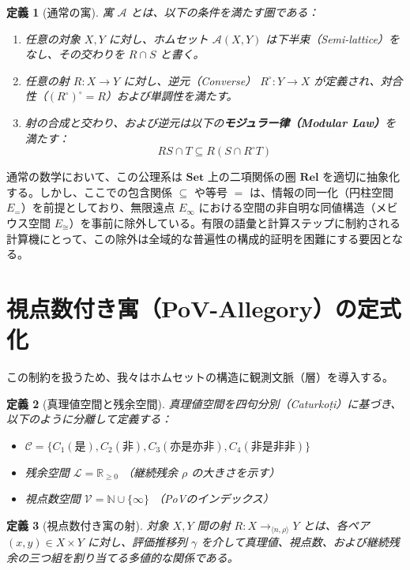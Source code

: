 \documentclass[11pt,a4paper]{article}
\newtheorem{definition}{定義}[section]
\begin{document}
\begin{definition}[通常の寓]
寓 $\mathcal{A}$ とは、以下の条件を満たす圏である：
\begin{enumerate}
    \item 任意の対象 $X, Y$ に対し、ホムセット $\mathcal{A}(X,Y)$ は下半束（Semi-lattice）をなし、その交わりを $R \cap S$ と書く。
    \item 任意の射 $R: X \to Y$ に対し、逆元（Converse） $R^\circ: Y \to X$ が定義され、対合性（$(R^\circ)^\circ = R$）および単調性を満たす。
    \item 射の合成と交わり、および逆元は以下の\textbf{モジュラー律（Modular Law）}を満たす：
    \begin{equation}
        RS \cap T \subseteq R(S \cap R^\circ T)
    \end{equation}
\end{enumerate}
\end{definition}

通常の数学において、この公理系は $\mathbf{Set}$ 上の二項関係の圏 $\mathbf{Rel}$ を適切に抽象化する。しかし、ここでの包含関係 $\subseteq$ や等号 $=$ は、情報の同一化（円柱空間 $E_=$）を前提としており、無限遠点 $E_\infty$ における空間の非自明な同値構造（メビウス空間 $E_{\cong}$）を事前に除外している。有限の語彙と計算ステップに制約される計算機にとって、この除外は全域的な普遍性の構成的証明を困難にする要因となる。

\section{視点数付き寓（PoV-Allegory）の定式化}
この制約を扱うため、我々はホムセットの構造に観測文脈（層）を導入する。

\begin{definition}[真理値空間と残余空間]
真理値空間を四句分別（Caturkoṭi）に基づき、以下のように分離して定義する：
\begin{itemize}
    \item $\mathcal{C} = \{C_1(\text{是}), C_2(\text{非}), C_3(\text{亦是亦非}), C_4(\text{非是非非})\}$
    \item 残余空間 $\mathcal{L} = \mathbb{R}_{\ge 0}$ （継続残余 $\rho$ の大きさを示す）
    \item 視点数空間 $\mathcal{V} = \mathbb{N} \cup \{\infty\}$ （PoVのインデックス）
\end{itemize}
\end{definition}

\begin{definition}[視点数付き寓の射]
対象 $X, Y$ 間の射 $R: X \to_{\langle n, \rho \rangle} Y$ とは、各ペア $(x,y) \in X \times Y$ に対し、評価推移列 $\gamma$ を介して真理値、視点数、および継続残余の三つ組を割り当てる多値的な関係である。
\end{definition}
\end{document}
